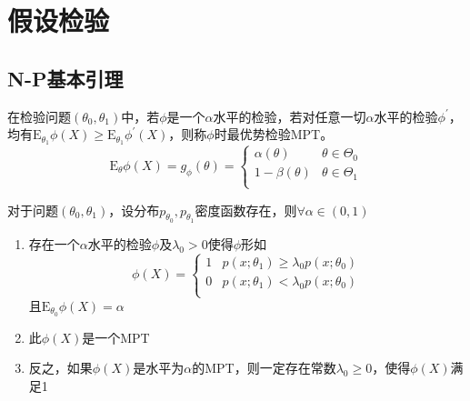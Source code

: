 \section{假设检验}
\subsection{N-P基本引理}
\begin{definition}[最优势检验]
    在检验问题$(\theta_0,\theta_1)$中，若$\phi$是一个$\alpha$水平的检验，若对任意一切$\alpha$水平的检验$\phi^{\prime}$，均有$\mathrm{E}_{\theta_1}\phi(X)\geq \mathrm{E}_{\theta_1}\phi^{\prime}(X)$，则称$\phi$时最优势检验MPT。
    \[
        \mathrm{E}_{\theta}\phi(X) = g_{\phi}(\theta) = \left\{
            \begin{array}{ll}
                \alpha(\theta) & \theta\in\Theta_0\\
                1-\beta(\theta) & \theta\in\Theta_1\\
            \end{array}
        \right.
    \]
\end{definition}
\begin{theorem}[N-P引理]
    对于问题$(\theta_0,\theta_1)$，设分布$p_{\theta_0},p_{\theta_1}$密度函数存在，则$\forall \alpha\in(0,1)$
    \begin{enumerate}
        \item 存在一个$\alpha$水平的检验$\phi$及$\lambda_0>0$使得$\phi$形如
        \[
            \phi(X) = \left\{
                \begin{array}{ll}
                    1 & p(x;\theta_1)\geq \lambda_0 p(x;\theta_0)\\
                    0 & p(x;\theta_1)< \lambda_0 p(x;\theta_0)\\
                \end{array}
            \right.
        \]
        且$\mathrm{E}_{\theta_0}\phi(X) = \alpha$ 
        \item 此$\phi(X)$是一个MPT
        \item 反之，如果$\phi(X)$是水平为$\alpha$的MPT，则一定存在常数$\lambda_0\geq 0$，使得$\phi(X)$满足1
    \end{enumerate}
\end{theorem}

